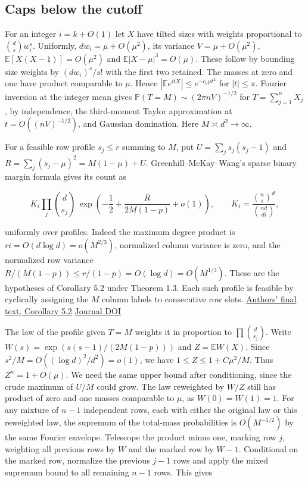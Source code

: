 \subsection{Caps below the cutoff}

For an integer $i=k+O(1)$ let $X$ have tilted sizes with weights proportional to $\binom ds w_i^s$. Uniformly, $dw_i=\mu+O(\mu^2)$, its variance $V=\mu+O(\mu^2)$, $\mathbb E[X(X-1)]=O(\mu^2)$ and $\mathbb E|X-\mu|^3=O(\mu)$. These follow by bounding size weights by $(dw_i)^s/s!$ with the first two retained. The masses at zero and one have product comparable to $\mu$. Hence
$|\mathbb E e^{itX}|\le e^{-c_0\mu t^2}$ for $|t|\le\pi$. Fourier inversion at the integer mean gives $\mathbb P(T=M)\sim(2\pi nV)^{-1/2}$ for $T=\sum_{j=1}^n X_j$, by independence, the third-moment Taylor approximation at $t=O((nV)^{-1/2})$, and Gaussian domination. Here $M\asymp d^2\to\infty$.

For a feasible row profile $s_j\le r$ summing to $M$, put $U=\sum_j s_j(s_j-1)$ and $R=\sum_j(s_j-\mu)^2=M(1-\mu)+U$. Greenhill--McKay--Wang's sparse binary margin formula gives its count as

\begin{equation*}
K_i\prod_j\binom d{s_j}\,
 \exp\!\left(-\frac12+\frac{R}{2M(1-p)}+o(1)\right),
\qquad K_i=\frac{\binom ni^d}{\binom{nd}{di}},
\end{equation*}

uniformly over profiles. Indeed the maximum degree product is $ri=O(d\log d)=o(M^{2/3})$, normalized column variance is zero, and the normalized row variance $R/(M(1-p))\le r/(1-p)=O(\log d)=O(M^{1/3})$. These are the hypotheses of Corollary 5.2 under Theorem 1.3. Each such profile is feasible by cyclically assigning the $M$ column labels to consecutive row slots. \href{https://web.maths.unsw.edu.au/~csg/papers/irregular-final.pdf#page=33}{Authors' final text, Corollary 5.2} \enspace \href{https://doi.org/10.1016/j.jcta.2005.03.005}{Journal DOI}

The law of the profile given $T=M$ weights it in proportion to $\prod\binom d{s_j}$. Write $W(s)=\exp(s(s-1)/(2M(1-p)))$ and $Z=\mathbb E W(X)$. Since $s^2/M=O((\log d)^2/d^2)=o(1)$, we have $1\le Z\le1+C\mu^2/M$. Thus $Z^n=1+O(\mu)$. We need the same upper bound after conditioning, since the crude maximum of $U/M$ could grow. The law reweighted by $W/Z$ still has product of zero and one masses comparable to $\mu$, as $W(0)=W(1)=1$. For any mixture of $n-1$ independent rows, each with either the original law or this reweighted law, the supremum of the total-mass probabilities is $O(M^{-1/2})$ by the same Fourier envelope. Telescope the product minus one, marking row $j$, weighting all previous rows by $W$ and the marked row by $W-1$. Conditional on the marked row, normalize the previous $j-1$ rows and apply the mixed supremum bound to all remaining $n-1$ rows. This gives

